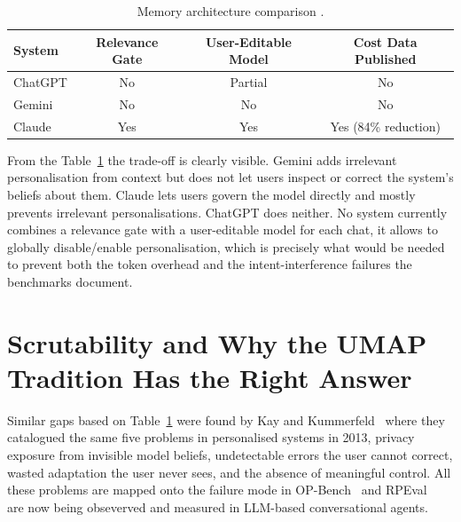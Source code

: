 \documentclass[runningheads]{llncs}
\begin{document}
\begin{table}

\caption{Memory architecture comparison .}\label{tab:comparison}

\begin{tabular}{|l|c|c|c|}

\hline

\textbf{System} & \textbf{Relevance Gate} & \textbf{User-Editable Model} & \textbf{Cost Data Published}\\

\hline

ChatGPT & No & Partial & No \\

Gemini & No & No & No \\

Claude & Yes & Yes & Yes (84\% reduction) \\

\hline

\end{tabular}

\end{table}

From the Table~\ref{tab:comparison} the trade-off is clearly visible. Gemini adds irrelevant personalisation from context but does not let users inspect or correct the system's beliefs about them. Claude lets users govern the model directly and mostly prevents irrelevant personalisations. ChatGPT does neither. No system currently combines a relevance gate with a user-editable model for each chat, it allows to globally disable/enable personalisation, which is precisely what would be needed to prevent both the token overhead and the intent-interference failures the benchmarks document.

\section{Scrutability and Why the UMAP Tradition Has the Right Answer}

\label{sec:scrutability}

Similar gaps based on Table~\ref{tab:comparison} were found by Kay and Kummerfeld~\cite{kay2013} where they catalogued the same five problems in personalised systems in 2013, privacy exposure from invisible model beliefs, undetectable errors the user cannot correct, wasted adaptation the user never sees, and the absence of meaningful control. All these problems are mapped onto the failure mode in OP-Bench~\cite{opbench2026} and RPEval~\cite{rpeval2026} are now being obseverved and measured in LLM-based conversational agents. 
\end{document}

